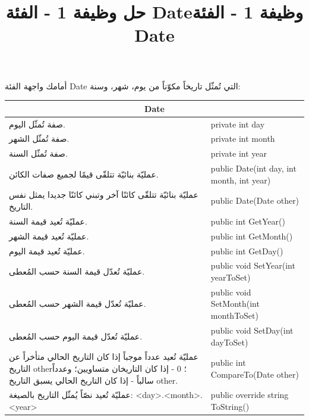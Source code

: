 \documentclass[14pt]{extarticle}
\title{حل وظيفة 1 - الفئة \textenglish{Date}}
\title{وظيفة 1 - الفئة \textenglish{Date}}
\begin{document}
\maketitle

أمامك واجهة الفئة \textenglish{Date} التي تُمثّل تاريخاً مكوّناً من يوم، شهر، وسنة:

\begin{center}
\renewcommand{\arraystretch}{1.8}
{\small
\begin{tabular}{|p{}|l|}
\hline
\multicolumn{2}{|c|}{\textbf{\textenglish{Date}}} \\
\hline
صفة تُمثّل اليوم. & \textenglish{private int day} \\
\hline
صفة تُمثّل الشهر. & \textenglish{private int month} \\
\hline
صفة تُمثّل السنة. & \textenglish{private int year} \\
\hline
عمليّة بنائيّة تتلقّى قيمًا لجميع صفات الكائن. & \textenglish{public Date(int day, int month, int year)} \\
\hline
عمليّة بنائيّة تتلقّى كائنًا آخر وتبني كائنًا جديدا يمثل نفس التاريخ. & \textenglish{public Date(Date other)} \\
\hline
عمليّة تُعيد قيمة السنة. & \textenglish{public int GetYear()} \\
\hline
عمليّة تُعيد قيمة الشهر. & \textenglish{public int GetMonth()} \\
\hline
عمليّة تُعيد قيمة اليوم. & \textenglish{public int GetDay()} \\
\hline
عمليّة تُعدّل قيمة السنة حسب المُعطى.  & \textenglish{public void SetYear(int yearToSet)} \\
\hline
عمليّة تُعدّل قيمة الشهر حسب المُعطى. & \textenglish{public void SetMonth(int monthToSet)} \\
\hline
عمليّة تُعدّل قيمة اليوم حسب المُعطى. & \textenglish{public void SetDay(int dayToSet)} \\
\hline
عمليّة تُعيد عدداً موجباً إذا كان التاريخ الحالي متأخراً عن التاريخ \textenglish{other}؛ 0 - إذا كان التاريخان متساويين؛ وعدداً سالباً - إذا كان التاريخ الحالي يسبق التاريخ \textenglish{other}. & \textenglish{public int CompareTo(Date other)} \\
\hline
عمليّة تُعيد نصّاً يُمثّل التاريخ بالصيغة: \textenglish{<day>.<month>.<year>} & \textenglish{public override string ToString()} \\
\hline
\end{tabular}
}
\end{center}
\end{document}
